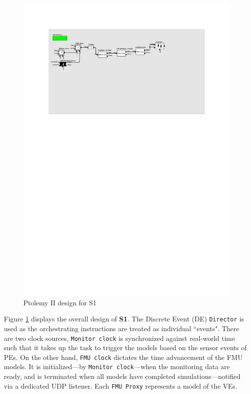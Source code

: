 \begin{figure}[hbt!]
  \centering
  \includegraphics[scale=1.1]{figures/s1_pt_de.pdf}
  \caption{Ptolemy II design for S1}
  \label{fig:s1_pt_de}
\end{figure}

Figure \ref{fig:s1_pt_de} displays the overall design of \textbf{S1}. The Discrete Event (DE) \texttt{Director} is used as the orchestrating instructions are treated as individual ``events". There are two clock sources, \texttt{Monitor clock} is synchronized against real-world time such that it takes up the task to trigger the models based on the sensor events of PEs. On the other hand, \texttt{FMU clock} dictates the time advancement of the FMU models. It is initialized---by \texttt{Monitor clock}---when the monitoring data are ready, and is terminated when all models have completed simulations---notified via a dedicated UDP listener. Each \texttt{FMU Proxy} represents a model of the VEs.

